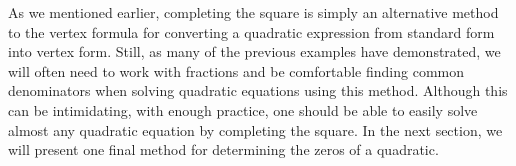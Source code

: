 \newpage

As we mentioned earlier, completing the square is simply an alternative method to the vertex formula for converting a quadratic expression from standard form into vertex form.  Still, as many of the previous examples have demonstrated, we will often need to work with fractions and be comfortable finding common denominators when solving quadratic equations using this method.  Although this can be intimidating, with enough practice, one should be able to easily solve almost any quadratic equation by completing the square. %
\pp
In the next section, we will present one final method for determining the zeros of a quadratic.